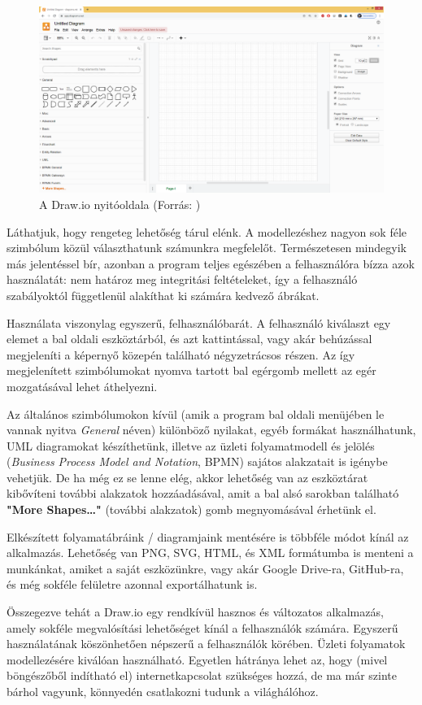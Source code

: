 \begin{figure}[h]
\centering
\includegraphics[scale=0.3]{images/drawio.png}
\caption{A Draw.io nyitóoldala (Forrás: \cite{drawio})}
\label{fig:drawio}
\end{figure}

Láthatjuk, hogy rengeteg lehetőség tárul elénk. A modellezéshez nagyon sok féle szimbólum közül választhatunk számunkra megfelelőt. Természetesen mindegyik más jelentéssel bír, azonban a program teljes egészében a felhasználóra bízza azok használatát: nem határoz meg integritási feltételeket, így a felhasználó szabályoktól függetlenül alakíthat ki számára kedvező ábrákat.

Használata viszonylag egyszerű, felhasználóbarát. A felhasználó kiválaszt egy elemet a bal oldali eszköztárból, és azt kattintással, vagy akár behúzással megjeleníti a képernyő közepén található négyzetrácsos részen. Az így megjelenített szimbólumokat nyomva tartott bal egérgomb mellett az egér mozgatásával lehet áthelyezni.

Az általános szimbólumokon kívül (amik a program bal oldali menüjében le vannak nyitva \textit{General} néven) különböző nyilakat, egyéb formákat használhatunk, UML diagramokat készíthetünk, illetve az üzleti folyamatmodell és jelölés (\textit{Business Process Model and Notation}, BPMN) sajátos alakzatait is igénybe vehetjük. De ha még ez se lenne elég, akkor lehetőség van az eszköztárat kibővíteni további alakzatok hozzáadásával, amit a bal alsó sarokban található \textbf{"More Shapes\ldots"} (további alakzatok) gomb megnyomásával érhetünk el.

Elkészített folyamatábráink / diagramjaink mentésére is többféle módot kínál az alkalmazás. Lehetőség van PNG, SVG, HTML, és XML formátumba is menteni a munkánkat, amiket a saját eszközünkre, vagy akár Google Drive-ra, GitHub-ra, és még sokféle felületre azonnal exportálhatunk is.

Összegezve tehát a Draw.io egy rendkívül hasznos és változatos alkalmazás, amely sokféle megvalósítási lehetőséget kínál a felhasználók számára. Egyszerű használatának köszönhetően népszerű a felhasználók körében. Üzleti folyamatok modellezésére kiválóan használható. Egyetlen hátránya lehet az, hogy (mivel böngészőből indítható el) internetkapcsolat szükséges hozzá, de ma már szinte bárhol vagyunk, könnyedén csatlakozni tudunk a világhálóhoz.
